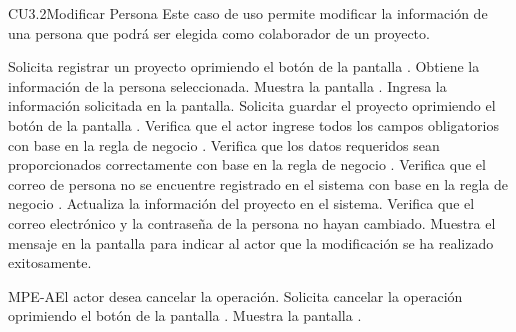 \begin{UseCase}{CU3.2}{Modificar Persona}{
		Este caso de uso permite modificar la información de una persona que podrá ser elegida como colaborador de un proyecto.
	}
{		}
	\end{UseCase}
	\begin{UCtrayectoria}
		\UCpaso[\UCactor] Solicita registrar un proyecto oprimiendo el botón \editar de la pantalla .
		\UCpaso[\UCsist] Obtiene la información de la persona seleccionada.
		\UCpaso[\UCsist] Muestra la pantalla .
		\UCpaso[\UCactor] Ingresa la información solicitada en la pantalla. \label{CU3.2-P4}
		\UCpaso[\UCactor] Solicita guardar el proyecto oprimiendo el botón  de la pantalla . 
		\UCpaso[\UCsist] Verifica que el actor ingrese todos los campos obligatorios con base en la regla de negocio . 
		\UCpaso[\UCsist] Verifica que los datos requeridos sean proporcionados correctamente con base en la regla de negocio .  
		\UCpaso[\UCsist] Verifica que el correo de persona no se encuentre registrado en el sistema con base en la regla de negocio . 
		\UCpaso[\UCsist] Actualiza la información del proyecto en el sistema.
		\UCpaso[\UCsist] Verifica que el correo electrónico y la contraseña de la persona no hayan cambiado. 
		\UCpaso[\UCsist] Muestra el mensaje  en la pantalla  para indicar al actor que la modificación se ha realizado exitosamente. 
	\end{UCtrayectoria}		
		\begin{UCtrayectoriaA}{MPE-A}{El actor desea cancelar la operación.}
			\UCpaso[\UCactor] Solicita cancelar la operación oprimiendo el botón  de la pantalla .
			\UCpaso[\UCsist] Muestra la pantalla .
		\end{UCtrayectoriaA}

